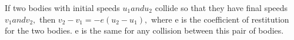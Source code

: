  If two bodies with initial speeds $u_{1} and u_{2}$  collide
so that they have final speeds $v_{1} and v_{2},$  then $v_{2}-v_{1}=-e(u_{2}-u_{1}),$  where
e is the coefficient of restitution for the two bodies. e is the
same for any collision between this pair of bodies.
